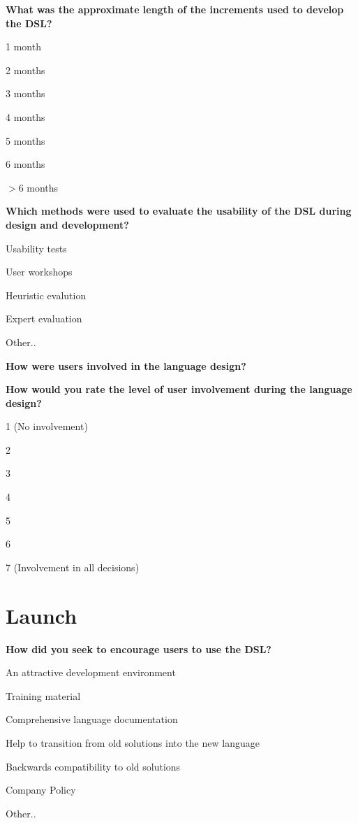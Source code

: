 \documentclass{article}
\begin{document}
\textbf{What was the approximate length of the increments used to develop the DSL?}
\begin{radio}
  \item 1 month
  \item 2 months
  \item 3 months
  \item 4 months
  \item 5 months
  \item 6 months
  \item $>6$ months
\end{radio}
\vspace{0.5cm}

\textbf{Which methods were used to evaluate the usability of the DSL during design and development?}
\begin{checklist}
  \item Usability tests
  \item User workshops
  \item Heuristic evalution
  \item Expert evaluation
  \item Other..
\end{checklist}
\vspace{0.5cm}

\textbf{How were users involved in the language design?} \\
\fbox{\begin{minipage}{\textwidth}
\
\
\
\end{minipage}}
\vspace{0.5cm}


\textbf{How would you rate the level of user involvement during the language design?}\\
\begin{radio}
  \item 1 (No involvement)
  \item 2
  \item 3
  \item 4
  \item 5
  \item 6
  \item 7 (Involvement in all decisions)
\end{radio}
\pagebreak

\section*{Launch}
\textbf{How did you seek to encourage users to use the DSL?}\\
\begin{checklist}
  \item An attractive development environment
  \item Training material
  \item Comprehensive language documentation
  \item Help to transition from old solutions into the new language
  \item Backwards compatibility to old solutions
  \item Company Policy
  \item Other..
\end{checklist}
\vspace{0.5cm}
\end{document}
